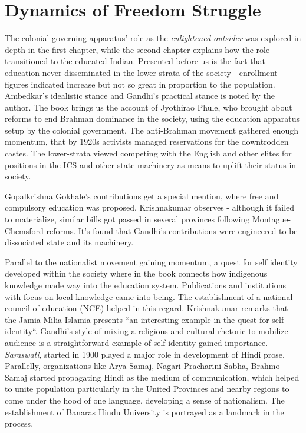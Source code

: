 \documentclass[a4paper]{article}
\begin{document}
\section{Dynamics of Freedom Struggle}
    The colonial governing apparatus' role as the
    \emph{enlightened outsider} was explored in depth in
    the first chapter, while the second chapter explains
    how the role transitioned to the educated Indian.
    Presented before us is the fact that education never
    disseminated in the lower strata of the society -
    enrollment figures indicated increase but not so
    great in proportion to the population. Ambedkar's
    idealistic stance and Gandhi's practical stance is
    noted by the author. The book brings us the account
    of Jyothirao Phule, who brought about reforms to end
    Brahman dominance in the society, using the
    education apparatus setup by the colonial
    government. The anti-Brahman movement gathered
    enough momentum, that by 1920s activists managed
    reservations for the downtrodden castes. The
    lower-strata viewed competing with the English and
    other elites for positions in the ICS and other
    state machinery as means to uplift their status in
    society.

    Gopalkrishna Gokhale's contributions get a special
    mention, where free and compulsory education was
    proposed. Krishnakumar observes - although it failed
    to materialize, similar bills got passed in several
    provinces following Montague-Chemsford reforms.
    It's found that Gandhi's contributions were
    engineered to be dissociated state and its
    machinery. 


    Parallel to the nationalist movement gaining
    momentum, a quest for self identity developed within
    the society where in the book connects how
    indigenous knowledge made way into the education
    system. Publications and institutions with focus on
    local knowledge came into being. The establishment
    of a national council of education (NCE) helped in
    this regard. Krishnakumar remarks that the Jamia
    Milia Islamia presents ``an interesting example in the
    quest for self-identity``. Gandhi's style of mixing a
    religious and cultural rhetoric to mobilize audience
    is a straightforward example of self-identity gained
    importance. \emph{Saraswati}, started in 1900 played
    a major role in development of Hindi prose.
    Parallelly, organizations like Arya Samaj, Nagari
    Pracharini Sabha, Brahmo Samaj started propagating
    Hindi as the medium of communication, which helped
    to unite population particularly in the United
    Provinces and nearby regions to come under the hood
    of one language, developing a sense of nationalism.  
    The establishment of Banaras Hindu University is
    portrayed as a landmark in the process. 



    


\printbibliography 
\end{document}
